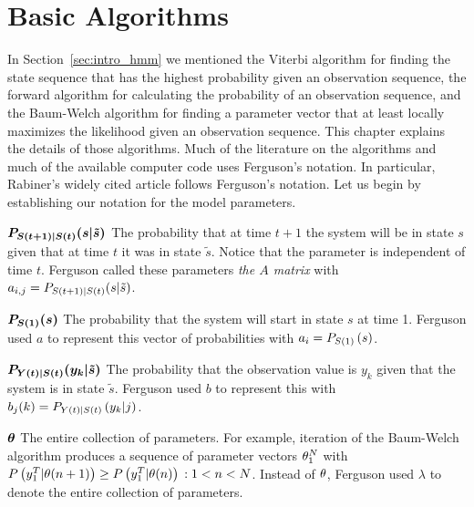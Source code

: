 \chapter{Basic Algorithms}
\label{chap:algorithms}



In Section~\ref{sec:intro_hmm} we mentioned the Viterbi algorithm for
finding the state sequence that has the highest probability given an
observation sequence, the forward algorithm for calculating the
probability of an observation sequence, and the Baum-Welch algorithm
for finding a parameter vector that at least locally maximizes the
likelihood given an observation sequence.  This chapter explains the
details of those algorithms.  Much of the literature on the algorithms
and much of the available computer code uses Ferguson's
\cite{Ferguson80} notation.  In particular, Rabiner's \cite{Rabiner89}
widely cited article follows Ferguson's notation.  Let us begin by
establishing our notation for the model parameters.
\setlength{\nomlabelwidth}{2.7cm}%
\begin{symbdescription}
\item[$\bm{P_{{S}{(t+1)}|{S}{(t)}}(s|{\tilde s})}$] The probability
  that at time $t+1$ the system will be in state $s$ given that at
  time $t$ it was in state ${\tilde s}$.  Notice that the parameter is
  independent of time $t$.  Ferguson called these parameters \emph{the
    $A$ matrix} with
  $a_{i,j} = P_{{S}{(t+1)}|{S}{(t)}}(s|{\tilde s})$.
\item[$\bm{P_{{S}{(1)}}(s)}$] The probability that the system will
  start in state $s$ at time 1.  Ferguson used $a$ to represent this
  vector of probabilities with $a_i = P_{{S}{(1)}} \left(s \right)$.
\item[$\bm{P_{{Y}{(t)}|{S}{(t)}}(y_k|{\tilde s})}$] The probability
  that the observation value is $y_k$ given that the system is in
  state ${\tilde s}$.  Ferguson used $b$ to represent this with
  $b_j(k) = P_{{Y}{(t)}|{S}{(t)}} \left(y_k|j \right)$.
\item[$\bm{\theta}$] The entire collection of parameters.  For
  example, iteration of the Baum-Welch algorithm produces a sequence
  of parameter vectors $\theta_{1}^{N}$ with
  $P\left(y_{1}^{T}|{\theta}{(n+1)}\right) \geq
  P\left(y_{1}^{T}|{\theta}{(n)}\right)\, : 1 < n < N$.
  Instead of $\theta$, Ferguson used $\lambda$ to denote the
  entire collection of parameters.
\end{symbdescription}

